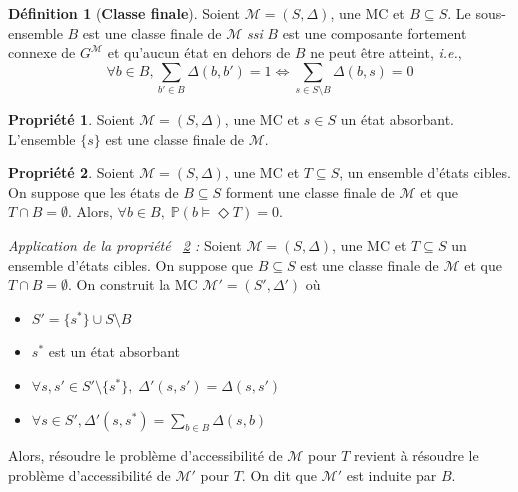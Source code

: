 \documentclass[12pt,a4paper]{report}
\theoremstyle{definition}%
\newtheorem{definition}{Définition}[chapter]
\newtheorem{propriete}{Propriété}[chapter]
\theoremstyle{remark}
\newcommand{\ssi}{\textit{ssi} }
\newcommand{\ie}{\textit{i.e.}, }
\let\labelitemi\labelitemii
\begin{document}
\begin{definition}[\textbf{Classe finale}]
	Soient $\mathcal{M} = (S, \Delta)$, une MC et $B \subseteq S$. Le sous-ensemble $B$ est une classe finale de $\mathcal{M}$ \ssi $B$ est une composante fortement connexe de $G^\mathcal{M}$ et qu'aucun état en dehors de $B$ ne peut être atteint, \ie
	\[\forall b \in B, \sum_{b' \in B} \Delta(b, b') = 1 \iff \sum_{s \in S \setminus B} \Delta(b, s) = 0\]
\end{definition}

\begin{propriete}
		Soient $\mathcal{M}=(S, \Delta)$, une MC et $s \in S$ un état absorbant. L'ensemble $\{s\}$ est une classe finale de $\mathcal{M}$.
\end{propriete}

\begin{propriete}\label{BSCC-tip1}
	Soient $\mathcal{M} = (S, \Delta)$, une MC et $T \subseteq S$, un ensemble d'états cibles. On suppose que les états de $B \subseteq S$ forment une classe finale de $\mathcal{M}$ et que $T \cap B = \emptyset$. Alors, $\forall b \in B, \; \mathbb{P}(b \models \Diamond T) = 0$.
\end{propriete}

\textit{Application de la propriété ~\ref{BSCC-tip1} : } Soient $\mathcal{M} = (S, \Delta)$, une MC et $T \subseteq S$ un ensemble d'états cibles. On suppose que $B \subseteq S$ est une classe finale de $\mathcal{M}$ et que $T \cap B = \emptyset$. On construit la MC $\mathcal{M}' = (S', \Delta')$ où 
\begin{itemize}
\renewcommand{\labelitemi}{\tiny$\bullet$}
\item $S' = \{s^*\} \cup S \setminus B$
\item $s^*$ est un état absorbant
\item $\forall s, s' \in S' \setminus \{s^*\}, \; \Delta'(s, s') = \Delta(s, s')$
\item $ \forall s \in S', \Delta'(s, s^*) = \sum_{b \in B} \Delta(s, b)$
\end{itemize}
Alors, résoudre le problème d'accessibilité de $\mathcal{M}$ pour $T$ revient à résoudre le problème d'accessibilité de $\mathcal{M}'$ pour $T$. On dit que $\mathcal{M'}$ est induite par $B$.\\
	
\end{document}
